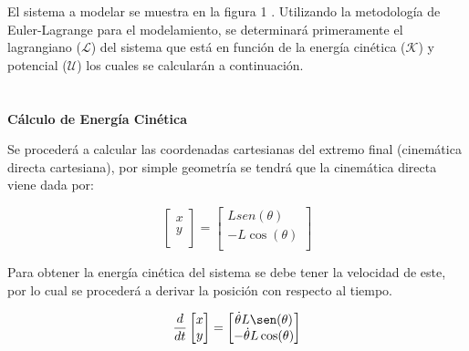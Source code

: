 \documentclass[12pt]{article}
\begin{document}
El sistema a modelar se muestra en la figura 1 \cite{taskin2017fuzzy}. Utilizando la metodología de Euler-Lagrange para el modelamiento,  se determinará primeramente el lagrangiano ($\mathcal{L}$) del sistema que está en función de la energía cinética ($\mathcal{K}$)   y potencial ($\mathcal{U}$) los cuales se calcularán a continuación.
\\
\\
\\
\textbf{Cálculo de Energía Cinética}

Se procederá a calcular las coordenadas cartesianas del extremo final  (cinemática directa cartesiana), por simple geometría se tendrá que la cinemática directa viene dada por:


\begin{equation}
    \begin{bmatrix}  x \\ y \\
    \end{bmatrix}=
    \begin{bmatrix} Lsen(\theta) \\ -L\cos(\theta)  \\
    \end{bmatrix}
    \label{eq:cin_direc}
\end{equation}

Para obtener la energía cinética del sistema se debe tener la velocidad de este, por lo cual se procederá a derivar la posición con respecto al tiempo.

\begin{equation}
    \frac{d}{dt}\begin{bmatrix}
        x \\
        y \\
    \end{bmatrix}=
    \begin{bmatrix}
        \dot{\theta}L\sen(\theta)  \\
        -\dot{\theta}L\cos(\theta)  \\
    \end{bmatrix}
    \label{eq:speed}
\end{equation}
\end{document}
